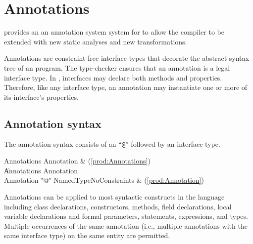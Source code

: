 \chapter{Annotations}\label{XtenAnnotations}


\Xten{} provides an 
an annotation system  system for to allow the
compiler to be extended with new static analyses and new
transformations.

Annotations are constraint-free interface types that decorate the abstract syntax tree
of an \Xten{} program.  The \Xten{} type-checker ensures that an annotation
is a legal interface type.
In \Xten{}, interfaces may declare
both methods and properties.  Therefore, like any interface type, an
annotation may instantiate
one or more of its interface's properties.

\section{Annotation syntax}

The annotation syntax consists of an ``\texttt{@}'' followed by an interface type.

\begin{bbgrammar}
         Annotations \: Annotation & (\ref{prod:Annotations}) \\
                     \| Annotations Annotation \\
          Annotation \: \xcd"@" NamedTypeNoConstraints & (\ref{prod:Annotation}) \\
\end{bbgrammar}

Annotations can be applied to most syntactic constructs in the language
including class declarations, constructors, methods, field declarations,
local variable declarations and formal parameters, statements,
expressions, and types.
Multiple occurrences of the same annotation (i.e., multiple
annotations with the same interface type) on the same entity are permitted.

